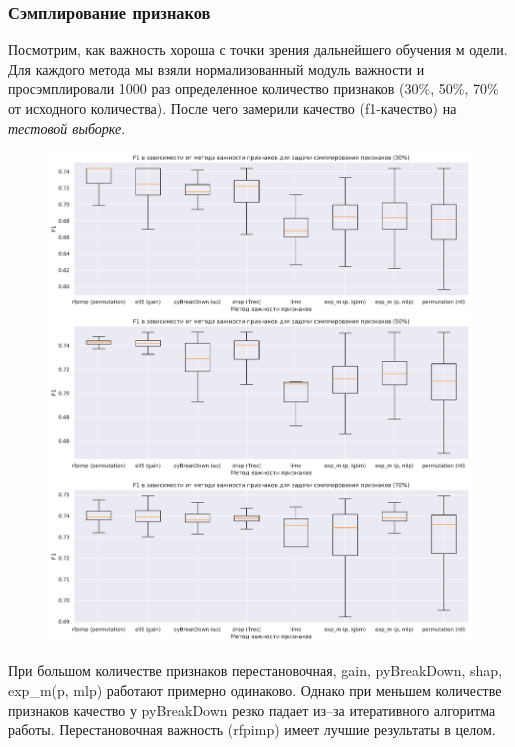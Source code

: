 \documentclass[12pt]{article}
\begin{document}
\subsubsection{Сэмплирование признаков}
Посмотрим, как важность хороша с точки зрения дальнейшего обучения м одели. Для каждого метода мы взяли нормализованный модуль важности и просэмплировали 1000 раз определенное количество признаков (30\%, 50\%, 70\% от исходного количества). После чего замерили качество (f1-качество) на \emph{тестовой выборке}.
\begin{figure}[h]
\centering
\includegraphics[width=\textwidth]{images/f1_feature_size.pdf}
\end{figure}

При большом количестве признаков перестановочная, gain, pyBreakDown, shap, exp\_m(p, mlp) работают примерно одинаково. Однако при меньшем количестве признаков качество у pyBreakDown резко падает из--за итеративного алгоритма работы. Перестановочная важность (rfpimp) имеет лучшие результаты в целом.

\newpage
\end{document}
